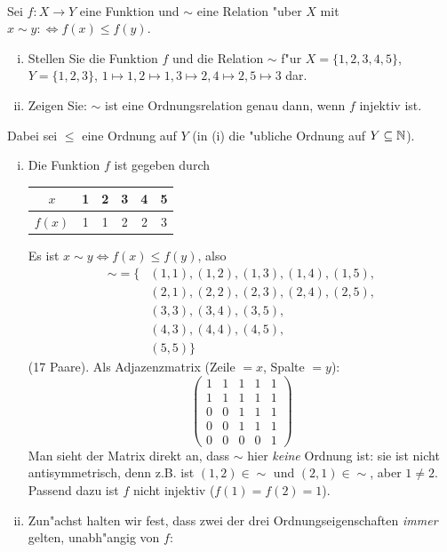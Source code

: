 \\
Sei $f:X\to Y$ eine Funktion und $\sim$ eine Relation "uber $X$ mit $x\sim y:\Leftrightarrow f(x)\leq f(y)$.
\begin{enumerate}[(i)]
    \item Stellen Sie die Funktion $f$ und die Relation $\sim$ f"ur $X=\{1,2,3,4,5\}$, $Y=\{1,2,3\}$, $1\mapsto 1, 2\mapsto 1, 3\mapsto 2, 4\mapsto 2, 5\mapsto 3$ dar.
    \item Zeigen Sie: $\sim$ ist eine Ordnungsrelation genau dann, wenn $f$ injektiv ist.
\end{enumerate}

\begin{loesung}
Dabei sei $\leq$ eine Ordnung auf $Y$ (in (i) die "ubliche Ordnung auf $Y\subseteq\mathbb{N}$).
\begin{enumerate}[(i)]
\item Die Funktion $f$ ist gegeben durch

\begin{center}
\begin{tabular}{c|ccccc}
$x$ & 1 & 2 & 3 & 4 & 5\\\hline
$f(x)$ & 1 & 1 & 2 & 2 & 3
\end{tabular}
\end{center}

Es ist $x\sim y\Leftrightarrow f(x)\leq f(y)$, also
\begin{align*}
{\sim}=\{&(1,1),(1,2),(1,3),(1,4),(1,5),\\
&(2,1),(2,2),(2,3),(2,4),(2,5),\\
&(3,3),(3,4),(3,5),\\
&(4,3),(4,4),(4,5),\\
&(5,5)\}
\end{align*}
(17 Paare). Als Adjazenzmatrix (Zeile $=x$, Spalte $=y$):
\[
\begin{pmatrix}
1&1&1&1&1\\
1&1&1&1&1\\
0&0&1&1&1\\
0&0&1&1&1\\
0&0&0&0&1
\end{pmatrix}
\]
Man sieht der Matrix direkt an, dass $\sim$ hier \emph{keine} Ordnung ist: sie ist nicht antisymmetrisch, denn z.B. ist $(1,2)\in{\sim}$ und $(2,1)\in{\sim}$, aber $1\neq 2$. Passend dazu ist $f$ nicht injektiv ($f(1)=f(2)=1$).

\item Zun"achst halten wir fest, dass zwei der drei Ordnungseigenschaften \emph{immer} gelten, unabh"angig von $f$:


\end{enumerate}
\end{loesung}
